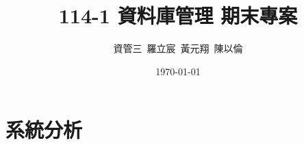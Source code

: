 \documentclass[a4paper]{article}
\title{114-1 資料庫管理 期末專案}
\author{資管三~羅立宸~黃元翔~陳以倫}
\date{\today} %
\begin{document}
\maketitle %

\section{系統分析} %
\end{document}
